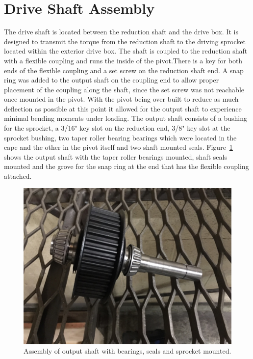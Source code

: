 \section{Drive Shaft Assembly}
The drive shaft is located between the reduction shaft and the drive box. It is designed to transmit the torque from the reduction shaft to the driving sprocket located within the exterior drive box. The shaft is coupled to the reduction shaft with a flexible coupling and runs the inside of the pivot.There is a key for both ends of the flexible coupling and a set screw on the reduction shaft end. A snap ring was added to the output shaft on the coupling end to allow proper placement of the coupling along the shaft, since the set screw was not reachable once mounted in the pivot. With the pivot being over built to reduce as much deflection as possible at this point it allowed for the output shaft to experience minimal bending moments under loading. The output shaft consists of a bushing for the sprocket, a 3/16" key slot on the reduction end, 3/8" key slot at the sprocket bushing, two taper roller bearing bearings which were located in the cape and the other in the pivot itself and two shaft mounted seals. Figure~\ref{fig:output_shaft} shows the output shaft with the taper roller bearings mounted, shaft seals mounted and the grove for the snap ring at the end that has the flexible coupling attached.
\begin{figure}[htbp]
	\includegraphics[width=\linewidth]{images/drive_shaft_assembly_bld.jpg}
	\caption{Assembly of output shaft with bearings, seals and sprocket mounted.}
	\label{fig:output_shaft}
\end{figure}

